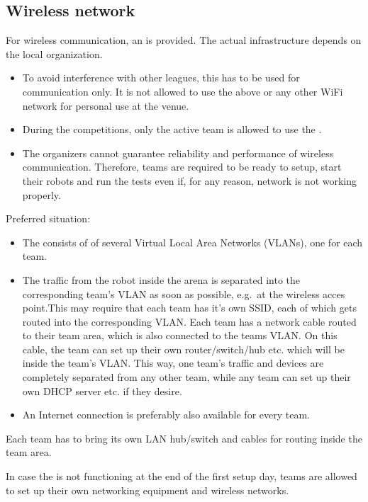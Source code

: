 \subsection{Wireless network}
\label{rule:scenario_wifi}

For wireless communication, an  is provided. The actual infrastructure depends on the local organization.

\begin{itemize}
	\item To avoid interference with other leagues, this  has to be used for communication only. It is not allowed to use the above or any other WiFi network for personal use at the venue.
	\item During the competitions, only the active team is allowed to use the .
	\item The organizers cannot guarantee reliability and performance of wireless communication. Therefore, teams are required to be ready to setup, start their robots and run the tests even if, for any reason, network is not working properly.
\end{itemize}

Preferred situation:
\begin{itemize}
	\item The  consists of of several Virtual Local Area Networks (VLANs), one for each team.
	\item The traffic from the robot inside the arena is separated into the corresponding team's VLAN as soon as possible, e.g.~at the wireless acces point.This may require that each team has it's own SSID, each of which gets routed into the corresponding VLAN. Each team has a network cable routed to their team area, which is also connected to the teams VLAN. On this cable, the team can set up their own router/switch/hub etc. which will be inside the team's VLAN. This way, one team's traffic and devices are completely separated from any other team, while any team can set up their own DHCP server etc. if they desire.
	\item An Internet connection is preferably also available for every team.
\end{itemize}
Each team has to bring its own LAN hub/switch and cables for routing inside the team area.

In case the  is not functioning at the end of the first setup day, teams are allowed to set up their own networking equipment and wireless networks.

